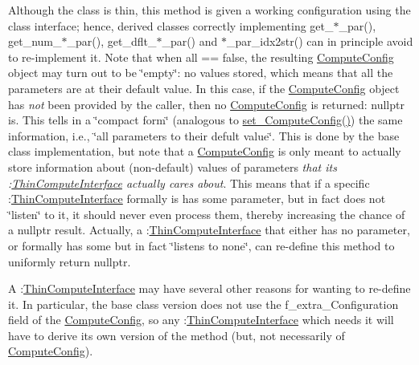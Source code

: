 Although the class is thin, this method is given a working configuration using the class interface; hence, derived classes correctly implementing get\+\_\+$\ast$\+\_\+par(), get\+\_\+num\+\_\+$\ast$\+\_\+par(), get\+\_\+dflt\+\_\+$\ast$\+\_\+par() and $\ast$\+\_\+par\+\_\+idx2str() can in principle avoid to re-\/implement it. Note that when all == false, the resulting \mbox{\hyperlink{class_s_m_spp__di__unipi__it_1_1_compute_config}{Compute\+Config}} object may turn out to be \char`\"{}empty\char`\"{}\+: no values stored, which means that all the parameters are at their default value. In this case, if the \mbox{\hyperlink{class_s_m_spp__di__unipi__it_1_1_compute_config}{Compute\+Config}} object has {\itshape not} been provided by the caller, then no \mbox{\hyperlink{class_s_m_spp__di__unipi__it_1_1_compute_config}{Compute\+Config}} is returned\+: nullptr is. This tells in a \char`\"{}compact form\char`\"{} (analogous to \mbox{\hyperlink{class_s_m_spp__di__unipi__it_1_1_f_row_constraint_afca3d4682961381f16cb8e0b5b88e81e}{set\+\_\+\+Compute\+Config()}}) the same information, i.\+e., \char`\"{}all parameters to their defult value\char`\"{}. This is done by the base class implementation, but note that a \mbox{\hyperlink{class_s_m_spp__di__unipi__it_1_1_compute_config}{Compute\+Config}} is only meant to actually store information about (non-\/default) values of parameters {\itshape that its \+:\mbox{\hyperlink{class_s_m_spp__di__unipi__it_1_1_thin_compute_interface}{Thin\+Compute\+Interface}} actually cares about}. This means that if a specific \+:\mbox{\hyperlink{class_s_m_spp__di__unipi__it_1_1_thin_compute_interface}{Thin\+Compute\+Interface}} formally is has some parameter, but in fact does not \char`\"{}listen\char`\"{} to it, it should never even process them, thereby increasing the chance of a nullptr result. Actually, a \+:\mbox{\hyperlink{class_s_m_spp__di__unipi__it_1_1_thin_compute_interface}{Thin\+Compute\+Interface}} that either has no parameter, or formally has some but in fact \char`\"{}listens to none\char`\"{}, can re-\/define this method to uniformly return nullptr.

A \+:\mbox{\hyperlink{class_s_m_spp__di__unipi__it_1_1_thin_compute_interface}{Thin\+Compute\+Interface}} may have several other reasons for wanting to re-\/define it. In particular, the base class version does not use the f\+\_\+extra\+\_\+\+Configuration field of the \mbox{\hyperlink{class_s_m_spp__di__unipi__it_1_1_compute_config}{Compute\+Config}}, so any \+:\mbox{\hyperlink{class_s_m_spp__di__unipi__it_1_1_thin_compute_interface}{Thin\+Compute\+Interface}} which needs it will have to derive its own version of the method (but, not necessarily of \mbox{\hyperlink{class_s_m_spp__di__unipi__it_1_1_compute_config}{Compute\+Config}}). 

